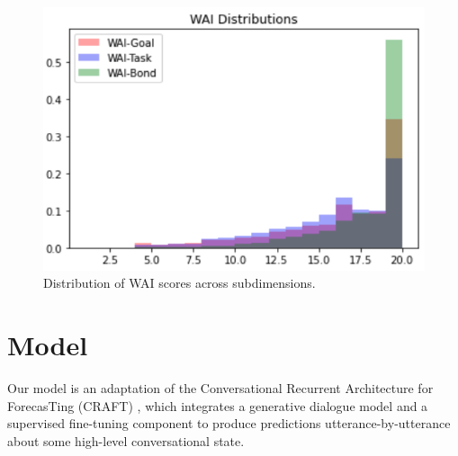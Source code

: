 \documentclass{article}
\begin{document}
\begin{figure}
  \includegraphics[width=\columnwidth]{figs/wai-distribution.png}
  \caption{Distribution of WAI scores across subdimensions.}
  \label{fig:wai-distribution}
\end{figure}


\section{Model}
\label{sec:model}





Our model is an adaptation of the Conversational Recurrent Architecture for ForecasTing (CRAFT) \cite{Chang-Trouble:19}, which integrates a generative dialogue model and a supervised fine-tuning component to produce predictions utterance-by-utterance about some high-level conversational state.
\end{document}
